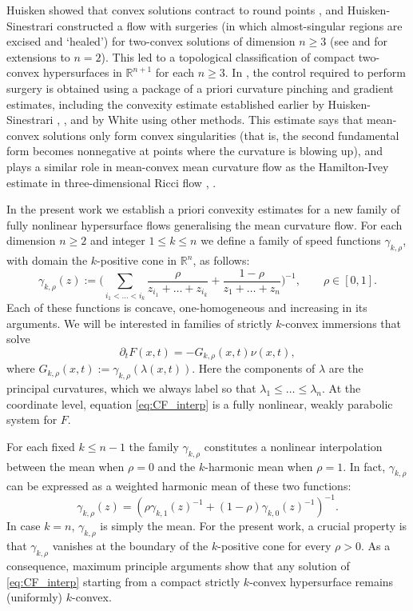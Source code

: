 \documentclass[12pt]{amsart}
\begin{document}
Huisken showed that convex solutions contract to round points \cite{Huisk84}, and Huisken-Sinestrari constructed a flow with surgeries (in which almost-singular regions are excised and `healed') for two-convex solutions of dimension $n \geq 3$ \cite{Huisk-Sin09} (see \cite{Bren-Huisk16} and \cite{Hasl-Klein_a} for extensions to $n=2$). This led to a topological classification of compact two-convex hypersurfaces in $\mathbb{R}^{n+1}$ for each $n\geq 3$. In \cite{Huisk-Sin09}, the control required to perform surgery is obtained using a package of a priori curvature pinching and gradient estimates, including the convexity estimate established earlier by Huisken-Sinestrari \cite{Huisk-Sin99a}, \cite{Huisk-Sin99}, and by White \cite{White03} using other methods. This estimate says that mean-convex solutions only form convex singularities (that is, the second fundamental form becomes nonnegative at points where the curvature is blowing up), and plays a similar role in mean-convex mean curvature flow as the Hamilton-Ivey estimate in three-dimensional Ricci flow \cite{Ivey}, \cite{Ham93}. 

In the present work we establish a priori convexity estimates for a new family of fully nonlinear hypersurface flows generalising the mean curvature flow. For each dimension $n \geq 2$ and integer $1 \leq k \leq n$ we define a family of speed functions $\gamma_{k,\rho}$, with domain the $k$-positive cone in $\mathbb{R}^n$, as follows:
\[\gamma_{k,\rho} (z) := \Bigg(\sum_{i_1 < \dots < i_k } \frac{\rho}{z_{i_1} + \dots + z_{i_k}} + \frac{1-\rho}{z_1 + \dots + z_n} \Bigg)^{-1}, \qquad \rho \in [0,1].\]
Each of these functions is concave, one-homogeneous and increasing in its arguments. We will be interested in families of strictly $k$-convex immersions that solve
\begin{equation}
\label{eq:CF_interp}
\partial_t F(x,t) = - G_{k,\rho}(x,t) \nu(x,t),
\end{equation}
where $G_{k,\rho}(x,t) := \gamma_{k,\rho}(\lambda(x,t))$. Here the components of $\lambda$ are the principal curvatures, which we always label so that $\lambda_1 \leq \dots \leq \lambda_n$. At the coordinate level, equation \eqref{eq:CF_interp} is a fully nonlinear, weakly parabolic system for $F$.  

For each fixed $k \leq n-1$ the family $\gamma_{k,\rho}$ constitutes a nonlinear interpolation between the mean when $\rho =0$ and the $k$-harmonic mean when $\rho=1$. In fact, $\gamma_{k,\rho}$ can be expressed as a weighted harmonic mean of these two functions:
\[\gamma_{k,\rho}(z) = (\rho \gamma_{k,1}(z)^{-1} + (1-\rho) \gamma_{k,0}(z)^{-1})^{-1}.\]
In case $k = n$, $\gamma_{k,\rho}$ is simply the mean. For the present work, a crucial property is that $\gamma_{k,\rho}$ vanishes at the boundary of the $k$-positive cone for every $\rho>0$. As a consequence, maximum principle arguments show that any solution of \eqref{eq:CF_interp} starting from a compact strictly $k$-convex hypersurface remains (uniformly) $k$-convex. 
\end{document}
